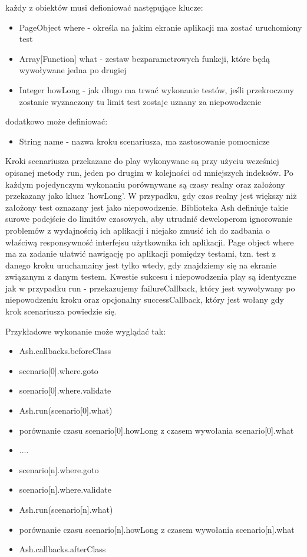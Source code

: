 \documentclass[brudnopis]{xmgr}
\begin{document}
każdy z obiektów musi defioniować następujące klucze:

\begin{itemize}
  \item PageObject where - określa na jakim ekranie aplikacji ma zostać uruchomiony test
  \item Array[Function] what - zestaw bezparametrowych funkcji, które będą wywoływane jedna po drugiej 
  \item Integer howLong - jak długo ma trwać wykonanie testów, jeśli przekroczony zostanie wyznaczony tu limit test zostaje uznany za niepowodzenie 
\end{itemize}

dodatkowo może definiować:

\begin{itemize} 
  \item String name - nazwa kroku scenariusza, ma zastosowanie pomocnicze
\end{itemize}

Kroki scenariusza przekazane do play wykonywane są przy użyciu wcześniej opisanej metody run, jeden po drugim w kolejności od mniejszych indeksów. Po każdym pojedynczym wykonaniu porównywane są czasy realny oraz założony przekazany jako klucz 'howLong'. W przypadku, gdy czas realny jest większy niż założony test oznazany jest jako niepowodzenie. Biblioteka Ash definiuje takie surowe podejście do limitów czasowych, aby utrudnić deweloperom ignorowanie problemów z wydajnością ich aplikacji i niejako zmusić ich do zadbania o właściwą responsywność interfejsu użytkownika ich aplikacji. Page object where ma za zadanie ułatwić nawigację po aplikacji pomiędzy testami, tzn. test z danego kroku uruchamainy jest tylko wtedy, gdy znajdziemy się na ekranie związanym z danym testem. Kwestie sukcesu i niepowodzenia play są identyczne jak w przypadku run - przekazujemy failureCallback, który jest wywoływany po niepowodzeniu kroku oraz opcjonalny successCallback,  który jest wołany gdy krok scenariusza powiedzie się. 

Przykładowe wykonanie może wyglądać tak:

\begin{itemize}
  \item Ash.callbacks.beforeClass
  \item scenario[0].where.goto
  \item scenario[0].where.validate
  \item Ash.run(scenario[0].what)
  \item porównanie czasu scenario[0].howLong z czasem wywołania scenario[0].what
  \item ....
  \item scenario[n].where.goto
  \item scenario[n].where.validate
  \item Ash.run(scenario[n].what)
  \item porównanie czasu scenario[n].howLong z czasem wywołania scenario[n].what
  \item Ash.callbacks.afterClass
\end{itemize}
\end{document}

